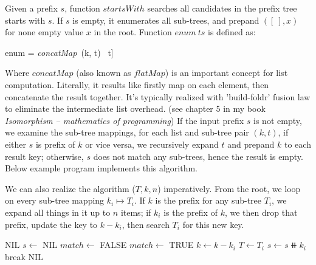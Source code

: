 \documentclass[b5paper]{article}
\begin{document}
Given a prefix $s$, function $startsWith$ searches all candidates in the prefix tree starts with $s$. If $s$ is empty, it enumerates all sub-trees, and prepand $([\ ], x)$ for none empty value $x$ in the root. Function $enum\ ts$ is defined as:

\be
enum = \textit{concatMap}\ (k, t) \mapsto [(k \doubleplus a, b) | (a, b) \in startsWith\ [\ ]\ t]
\ee

\label{sec:list-concatmap}
Where $\textit{concatMap}$ (also known as $\textit{flatMap}$) is an important concept for list computation. Literally, it results like firstly map on each element, then concatenate the result together. It's typically realized with 'build-foldr' fusion law to eliminate the intermediate list overhead. (see chapter 5 in my book {\em Isomorphism -- mathematics of programming}) If the input prefix $s$ is not empty, we examine the sub-tree mappings, for each list and sub-tree pair $(k, t)$, if either $s$ is prefix of $k$ or vice versa, we recursively expand $t$ and prepand $k$ to each result key; otherwise, $s$ does not match any sub-trees, hence the result is empty. Below example program implements this algorithm.


We can also realize the algorithm ($T, k, n$) imperatively. From the root, we loop on every sub-tree mapping $k_i \mapsto T_i$. If $k$ is the prefix for any sub-tree $T_i$, we expand all things in it up to $n$ items; if $k_i$ is the prefix of $k$, we then drop that prefix, update the key to $k - k_i$, then search $T_i$ for this new key.

\begin{algorithmic}[1]
     \State \Return NIL
  \EndIf
  \State $s \gets$ NIL
  \Repeat
    \State $match \gets$ FALSE
        \State \Return {}
      \EndIf
        \State $match \gets$ TRUE
        \State $k \gets k - k_i$  
        \State $T \gets T_i$
        \State $s \gets s \doubleplus k_i$
        \State break
      \EndIf
    \EndFor
  \State \Return NIL
\EndFunction
\end{algorithmic}
\end{document}

